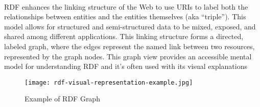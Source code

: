 \\
RDF enhances the linking structure of the Web to use URIs to label both the relationships between entities and the entities themselves (aka “triple”). This model allows for structured and semi-structured data to be mixed, exposed, and shared among different applications.
This linking structure forms a directed, labeled graph, where the edges represent the named link between two resources, represented by the graph nodes. This graph view provides an accessible mental model for understanding RDF and it's often used with its visual explanations
\begin{figure}[htb]
  \centering
  \texttt{[image: rdf-visual-representation-example.jpg]}\\
  \caption{Example of RDF Graph}\label{fig:RDFTriple}
\end{figure}

